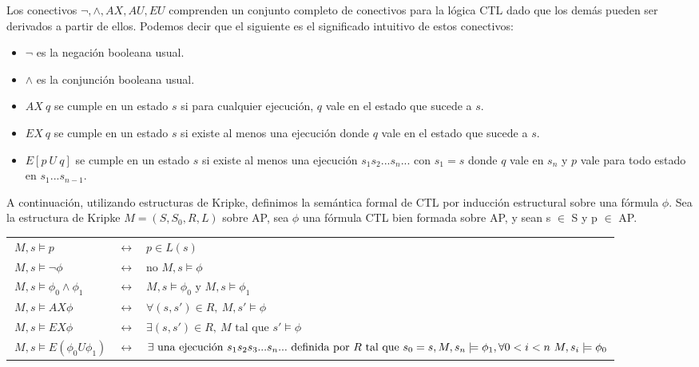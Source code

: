 \documentclass[titlepage, 12pt]{book}
\begin{document}
Los conectivos ${\neg,\wedge,AX,AU,EU}$ comprenden un conjunto completo de conectivos para la l\'ogica CTL dado que los dem\'as pueden ser derivados a partir de ellos. Podemos decir que el siguiente es el significado intuitivo de estos conectivos:
\begin{itemize}
\item $\neg$ es la negaci\'on booleana usual.
\item $\wedge$ es la conjunci\'on booleana usual.
\item $AX~q$ se cumple en un estado $s$ si para cualquier ejecuci\'on, $q$ vale en el estado que sucede a $s$.
\item $EX~q$ se cumple en un estado $s$ si existe al menos una ejecuci\'on donde $q$ vale en el estado que sucede a $s$.
\item $E[p~U~q]$ se cumple en un estado $s$ si existe al menos una ejecuci\'on $s_1s_2...s_n...$ con $s_1 = s$ donde $q$ vale en $s_n$ y $p$ vale para todo estado en $s_1...s_{n-1}$.
\end{itemize}

A continuaci\'on, utilizando estructuras de Kripke, definimos la sem\'antica formal de CTL por inducci\'on estructural sobre una f\'ormula $\phi$. Sea la estructura de Kripke $M =(S,S_0,R,L)$ sobre AP, sea $\phi$ una f\'ormula CTL bien formada sobre AP, y sean s $\in$ S y p $\in$ AP.\\

\begin{tabularx}{\textwidth}{@{\textbullet}lcX}
$~M,s \models p$ & $\leftrightarrow$ & $p \in L(s)$\\
$~M,s \models \neg\phi $ & $\leftrightarrow$ & $ \text{no } M,s \models \phi$\\
$~M,s \models \phi_0 \wedge \phi_1 $ & $\leftrightarrow$ & $ M,s \models \phi_0 \text{ y } M,s \models \phi_1$\\
$~M,s \models AX\phi $ & $\leftrightarrow$ & $ \forall (s,s') \in R,~ M,s' \models \phi$\\
$~M,s \models EX\phi $ & $\leftrightarrow$ & $ \exists (s,s') \in R,~M \text{ tal que } s' \models \phi$\\
$~M,s \models E(\phi_0 U \phi_1) $ & $\leftrightarrow$ & $\exists \text{ una ejecuci\'on } s_1s_2s_3...s_n... \text{ definida por } R \text{ tal que }\linebreak  s_0 = s, M,s_n \models \phi_1, \forall 0<i<n~ M, s_i \models \phi_0$\\
\end{tabularx}
\end{document}
